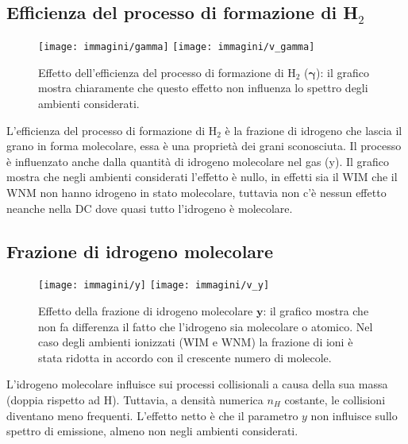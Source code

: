 \subsection{Efficienza del processo di formazione di H$_2$}
\begin{figure}
	
	\centerline{
		\centering
		\subfigure
		{\texttt{[image: immagini/gamma]}}
		\hspace{-5mm}
		\subfigure
		{\texttt{[image: immagini/v\_gamma]}}
	}
	\caption{Effetto dell'efficienza del processo di formazione di H$_2$ ($\boldsymbol{\gamma}$): il grafico mostra chiaramente che questo effetto non influenza lo spettro degli ambienti considerati.}
	\label{plotgamma}
\end{figure}

L'efficienza del processo di formazione di H$_2$ è la frazione di idrogeno che lascia il grano in forma molecolare, essa è una proprietà dei grani sconosciuta. Il processo è influenzato anche dalla quantità di idrogeno molecolare nel gas (y). Il grafico mostra che negli ambienti considerati l'effetto è nullo, in effetti sia il WIM che il WNM non hanno idrogeno in stato molecolare, tuttavia non c'è nessun effetto neanche nella DC dove quasi tutto l'idrogeno è molecolare.

\subsection{Frazione di idrogeno molecolare}
\begin{figure}

	\centerline{
		\centering
		\subfigure
		{\texttt{[image: immagini/y]}}
		\hspace{-5mm}
		\subfigure
		{\texttt{[image: immagini/v\_y]}}
	}
	\caption{Effetto della frazione di idrogeno molecolare $\boldsymbol{y}$: il grafico mostra che non fa differenza il fatto che l'idrogeno sia molecolare o atomico. Nel caso degli ambienti ionizzati (WIM e WNM) la frazione di ioni è stata ridotta in accordo con il crescente numero di molecole.}
		\label{ploty}
\end{figure}

L'idrogeno molecolare influisce sui processi collisionali a causa della sua massa (doppia rispetto ad H). Tuttavia, a densità numerica $n_H$ costante, le collisioni diventano meno frequenti. L'effetto netto è che il parametro $y$ non influisce sullo spettro di emissione, almeno non negli ambienti considerati.

